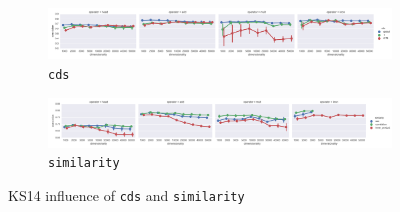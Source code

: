 \begin{figure}[b]
  \centering

  \begin{subfigure}[t]{\textwidth}
    \includegraphics[width=1.1\textwidth]{supplement/figures/KS14-interaction-cds}

  \caption{\texttt{cds}}
  \label{fig:ks14-cds}
  \end{subfigure}

  \begin{subfigure}[t]{\textwidth}
    \includegraphics[width=1.1\textwidth]{supplement/figures/KS14-interaction-similarity}

  \caption{\texttt{similarity}}
  \label{fig:ks14-similarity}
  \end{subfigure}

  \caption{KS14 influence of \texttt{cds} and \texttt{similarity}}
\end{figure}
